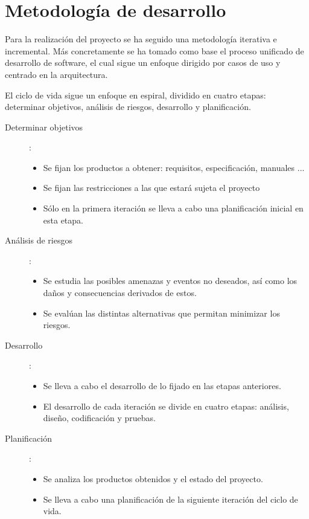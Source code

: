 \section{Metodología de desarrollo}

Para la realización del proyecto se ha seguido una metodología iterativa e incremental. Más concretamente se ha tomado como
base el proceso unificado de desarrollo de software, el cual sigue un enfoque dirigido por casos de uso y centrado en 
la arquitectura. 

El ciclo de vida sigue un enfoque en espiral, dividido en cuatro etapas: determinar objetivos, análisis de riesgos, desarrollo y planificación.

\begin{description}
\item[Determinar objetivos]: 
   \begin {itemize}
   \item Se fijan los productos a obtener: requisitos, especificación, manuales ...
   \item Se fijan las restricciones a las que estará sujeta el proyecto
   \item Sólo en la primera iteración se lleva a cabo una planificación inicial en esta etapa.
   \end{itemize}
\item[Análisis de riesgos]: 
   \begin {itemize}
   \item Se estudia las posibles amenazas y eventos no deseados, así como los daños y consecuencias derivados de estos.
   \item Se evalúan las distintas alternativas que permitan minimizar los riesgos.
   \end{itemize}
\item[Desarrollo]: 
   \begin {itemize}
   \item Se lleva a cabo el desarrollo de lo fijado en las etapas anteriores.
   \item El desarrollo de cada iteración se divide en cuatro etapas: análisis, diseño, codificación y pruebas.
   \end{itemize}
\item[Planificación]:
   \begin {itemize}
   \item Se analiza los productos obtenidos y el estado del proyecto.
   \item Se lleva a cabo una planificación de la siguiente iteración del ciclo de vida.
   \end{itemize}
\end{description}

